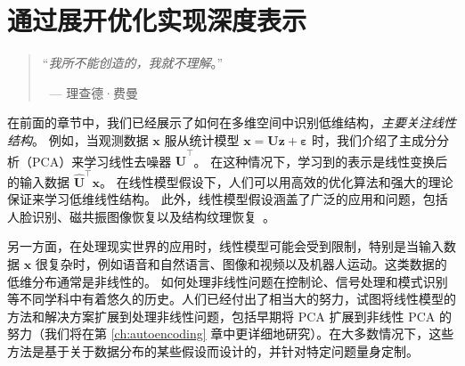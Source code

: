 \documentclass[../../book-main_zh.tex]{subfiles}
\begin{document}
\chapter{通过展开优化实现深度表示}
\label{ch:representation}
\label{ch:unrolling}

\begin{quote}
\hfill    ``{\em 我所不能创造的，我就不理解}。''

$~$ \hfill --- 理查德·费曼
\end{quote}
\vspace{5mm}




在前面的章节中，我们已经展示了如何在多维空间中识别低维结构，\textit{主要关注线性结构}。
例如，当观测数据 $\bm{x}$ 服从统计模型 $\bm{x} = \bm{U}\bm{z} + \bm{\varepsilon}$ 时，我们介绍了主成分分析（PCA）来学习线性去噪器 $\hat{\bm{U}}^{\top}$。
在这种情况下，学习到的表示是线性变换后的输入数据 $\hat{\bm{U}}^{\top}\bm{x}$。
在线性模型假设下，人们可以用高效的优化算法和强大的理论保证来学习低维线性结构。
此外，线性模型假设涵盖了广泛的应用和问题，包括人脸识别、磁共振图像恢复以及结构纹理恢复~\cite{Wright-Ma-2022}。

另一方面，在处理现实世界的应用时，线性模型可能会受到限制，特别是当输入数据 $\bm{x}$ 很复杂时，例如语音和自然语言、图像和视频以及机器人运动。这类数据的低维分布通常是非线性的。
如何处理非线性问题在控制论、信号处理和模式识别等不同学科中有着悠久的历史。人们已经付出了相当大的努力，试图将线性模型的方法和解决方案扩展到处理非线性问题，包括早期将 PCA 扩展到非线性 PCA 的努力（我们将在第 \ref{ch:autoencoding} 章中更详细地研究）。在大多数情况下，这些方法是基于关于数据分布的某些假设而设计的，并针对特定问题量身定制。
\end{document}
